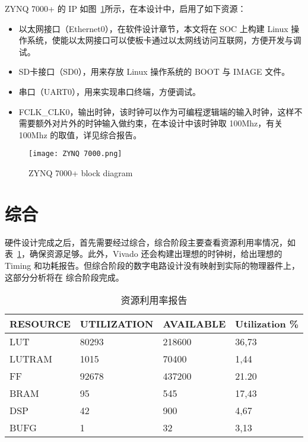 ZYNQ 7000+ 的 IP 如图~\ref{fig:ZYNQ 7000+}所示，在本设计中，启用了如下资源：

\begin{itemize}
    \item 以太网接口（Ethernet0），在软件设计章节，本文将在 SOC 上构建 Linux 操作系统，使能以太网接口可以使板卡通过以太网线访问互联网，方便开发与调试。
    \item SD卡接口（SD0），用来存放 Linux 操作系统的 BOOT 与 IMAGE 文件。
    \item 串口（UART0），用来实现串口终端，方便调试。
    \item FCLK\_CLK0，输出时钟，该时钟可以作为可编程逻辑端的输入时钟，这样不需要额外对片外的时钟输入做约束，在本设计中该时钟取 100Mhz，有关 100Mhz 的取值，详见综合报告。
\end{itemize}

\begin{figure}[!htbp]
    \centering
    \texttt{[image: ZYNQ 7000.png]}
    \caption{ZYNQ 7000+ block diagram}
    \label{fig:ZYNQ 7000+}
\end{figure}

\section{综合}

硬件设计完成之后，首先需要经过综合，综合阶段主要查看资源利用率情况，如表~\ref{tab:Resource Report}，确保资源足够。此外，Vivado 还会构建出理想的时钟树，给出理想的 Timing 和功耗报告。但综合阶段的数字电路设计没有映射到实际的物理器件上，这部分分析将在 综合阶段完成。

\begin{table}[!htbp]
    \caption{资源利用率报告}
    \label{tab:Resource Report}
    \centering
    \footnotesize%
    \setlength{\tabcolsep}{4pt}%
    \renewcommand{\arraystretch}{1.2}%
    \begin{tabular}{llll}
        \toprule
        \textbf{RESOURCE} & \textbf{UTILIZATION} & \textbf{AVAILABLE} & \textbf{Utilization \%} \\
        \midrule
        LUT               & 80293                & 218600               & 36,73                   \\
        LUTRAM            & 1015                 & 70400                & 1,44                    \\
        FF                & 92678                & 437200               & 21.20                   \\
        BRAM              & 95                   & 545                  & 17,43                   \\
        DSP               & 42                   & 900                  & 4,67                    \\
        BUFG              & 1                    & 32                   & 3,13                    \\
        \bottomrule                   
    \end{tabular}
\end{table}


